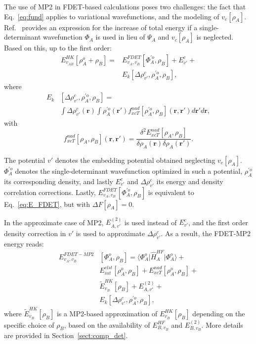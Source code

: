 \documentclass[journal=jctcce,manuscript=article, layout=twocolumn]{achemso}
\begin{document}
The use of MP2 in FDET-based calculations poses two challenges: the fact that Eq.~\ref{eq:fund} applies to variational wavefunctions, and the modeling of $v_c[\rho_A]$. Ref.~ provides an expression for the increase of total energy if a single-determinant wavefunction $\Phi_A$ is used in lieu of $\Psi_A$ and $v_c[\rho_A]$ is neglected. Based on this, up to the first order:
\begin{align} \label{eq:E_FDET_novc}
 E_{v_{AB}}^{HK}[\rho_A^{o}+\rho_B] =  & E_{v_A,v_B}^{FDET}[\Phi_{A}^{'o},\rho_B] + E^c_{v'} + \\ \nonumber
 & E_k[\Delta \rho^c_{v'}, \rho^{'o}_A, \rho_B],
\end{align}
where
\begin{align} \label{eq:kernel}
 E_k & [\Delta \rho^c_{v'}, \rho^{'o}_A, \rho_B] = \\ \nonumber
 & \int \Delta \rho^c_{v'}(\mathbf{r}) \int \rho^{'o}_A(\mathbf{r'})f^{nad}_{xcT}[\rho^{'o}_A, \rho_B](\mathbf{r},\mathbf{r'})d\mathbf{r'}d\mathbf{r},
\end{align}
with
\begin{equation} \label{eq:f_nad}
 f^{nad}_{xcT}[\rho_A, \rho_B](\mathbf{r},\mathbf{r'}) = \frac{\delta^2 E^{nad}_{xcT}[\rho_A, \rho_B]}{\delta \rho_A(\mathbf{r}) \delta \rho_A(\mathbf{r'})}.
\end{equation}

The potential $v'$ denotes the embedding potential obtained neglecting $v_c[\rho_A]$. $\Phi^{'o}_A$ denotes the single-determinant wavefunction optimized in such a potential, $\rho^{'o}_A$ its corresponding density, and lastly $E^c_{v'}$ and $\Delta \rho^c_{v'}$ its energy and density correlation corrections.
Lastly, $E_{v_A,v_B}^{FDET}[\Phi_{A}^{'o},\rho_B]$ is equivalent to Eq.~\ref{eq:E_FDET}, but with $\Delta F[\rho_A] = 0$.

In the approximate case of MP2, $E^{(2)}_{A,v'}$ is used instead of $E^c_{v'}$, and the first order density correction in $v'$ is used to approximate  $\Delta \rho^c_{v'}$.
As a result, the FDET-MP2 energy reads:
\begin{align} \label{eq:E_FDET_MP}
 E_{v_A,v_B}^{FDET-MP2} & [\Phi_{A}^{o},\rho_B] =  \langle\Phi^{o}_{A}\vert \hat{H}^{HF}_A\vert \Phi^{o}_{A}\rangle + \\ \nonumber
& E^{elst}_{int}[\rho^{o}_A,\rho_B] + E_{xcT}^{nad}[\rho^{o}_A,\rho_B] + \\ \nonumber
& \tilde{E}^{HK}_{v_B}[\rho_B] + E^{(2)}_{A,v'} + \\ \nonumber 
& E_k[\Delta \rho^c_{v'}, \rho^{'o}_A, \rho_B],
\end{align}
where $ \tilde{E}^{HK}_{v_B}[\rho_B]$ is a MP2-based approximation of $E^{HK}_{v_B}[\rho_B]$ depending on the specific choice of $\rho_B$, based on the availability of $E^{HF}_{B,v_B}$ and $E^{(2)}_{B,v_B}$. More details are provided in Section~\ref{sect:comp_det}.
\end{document}
